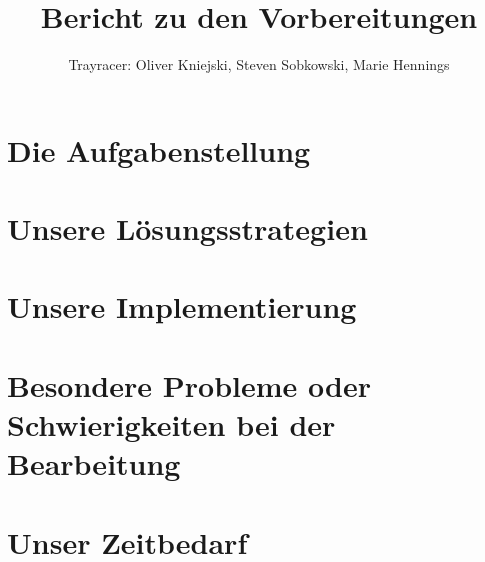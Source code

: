 \documentclass[a4paper,11pt]{scrartcl}
\author{Trayracer: Oliver Kniejski, Steven Sobkowski, Marie Hennings}
\title{Bericht zu den Vorbereitungen}
\begin{document}
 
\maketitle

\section{Die Aufgabenstellung}

\section{Unsere Lösungsstrategien}

\section{Unsere Implementierung}

\section{Besondere Probleme oder Schwierigkeiten bei der Bearbeitung}

\section{Unser Zeitbedarf}
\end{document}

